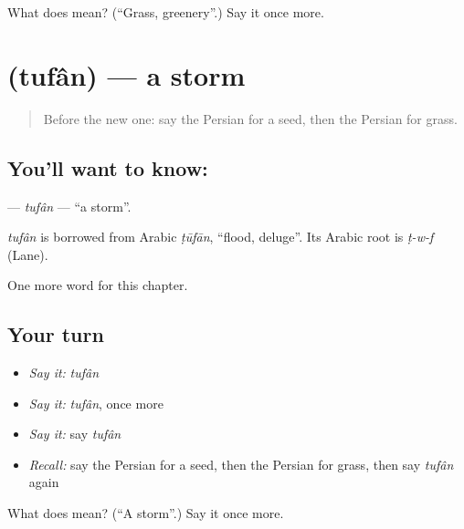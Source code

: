 \begin{tcolorbox}[breakable,colback=teal!4,colframe=teal!35!black,title={Before you move on}]
What does  mean? (\textquotedblleft{}Grass, greenery\textquotedblright{}.) Say it once more.
\end{tcolorbox}
\section[\texorpdfstring{\fa{توفان} (tufân)}{توفان (tufân)}]{ (tufân) — a storm}

\label{lesson:FA-C104-tufan}



\begin{quote}
Before the new one: say the Persian for a seed, then the Persian for grass.
\end{quote}

\subsection*{You'll want to know: }
\textbf{} — \emph{tufân} — \textquotedblleft{}a storm\textquotedblright{}.

\begin{cousinweb}
\emph{tufân} is borrowed from Arabic \emph{ṭūfān}, \textquotedblleft{}flood, deluge\textquotedblright{}. Its Arabic root is \emph{ṭ-w-f} (Lane).
\end{cousinweb}

\begin{grammarlens}[title={What you've built}]
One more word for this chapter.
\end{grammarlens}

\subsection*{Your turn}
\begin{itemize}
\raggedright
  \item \emph{Say it:} \emph{tufân}
  \item \emph{Say it:} \emph{tufân}, once more
  \item \emph{Say it:} say \emph{tufân}
  \item \emph{Recall:} say the Persian for a seed, then the Persian for grass, then say \emph{tufân} again
\end{itemize}

\begin{tcolorbox}[breakable,colback=teal!4,colframe=teal!35!black,title={Before you move on}]
What does  mean? (\textquotedblleft{}A storm\textquotedblright{}.) Say it once more.
\end{tcolorbox}

